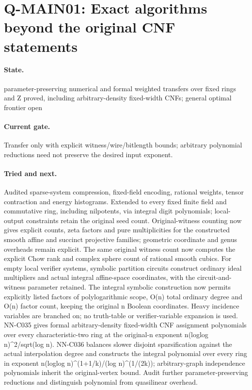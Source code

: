 \section{Q-MAIN01: Exact algorithms beyond the original CNF statements}
\paragraph{State.} parameter-preserving numerical and formal weighted transfers over fixed rings and Z proved, including arbitrary-density fixed-width CNFs; general optimal frontier open
\paragraph{Current gate.} Transfer only with explicit witness/wire/bitlength bounds; arbitrary polynomial reductions need not preserve the desired input exponent.
\paragraph{Tried and next.} Audited sparse-system compression, fixed-field encoding, rational weights, tensor contraction and energy histograms. Extended to every fixed finite field and commutative ring, including nilpotents, via integral digit polynomials; local-output constraints retain the original seed count. Original-witness counting now gives explicit counts, zeta factors and pure multiplicities for the constructed smooth affine and succinct projective families; geometric coordinate and genus overheads remain explicit. The same original witness count now computes the explicit Chow rank and complex sphere count of rational smooth cubics. For empty local verifier systems, symbolic partition circuits construct ordinary ideal multipliers and actual integral affine-space coordinates, with the circuit-and-witness parameter retained. The integral symbolic construction now permits explicitly listed factors of polylogarithmic scope, O(n) total ordinary degree and O(n) factor count, keeping the original n Boolean coordinates. Heavy incidence variables are branched on; no truth-table or verifier-variable expansion is used. NN-C035 gives formal arbitrary-density fixed-width CNF assignment polynomials over every characteristic-two ring at the original-n exponent n(loglog n)\textasciicircum{}2/sqrt(log n). NN-C036 balances slower disjoint sparsification against the actual interpolation degree and constructs the integral polynomial over every ring in exponent n(loglog n)\textasciicircum{}(1+1/k)/(log n)\textasciicircum{}(1/(2k)); arbitrary-graph independence polynomials inherit the original-vertex bound. Audit further parameter-preserving reductions and distinguish polynomial from quasilinear overhead.

